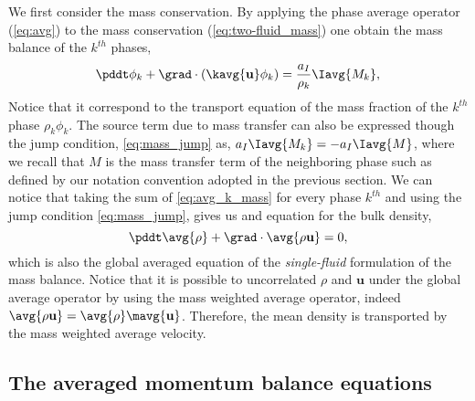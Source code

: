 We first consider the mass conservation. 
By applying the phase average operator (\ref{eq:avg}) to the mass conservation (\ref{eq:two-fluid_mass}) one obtain the mass balance of the $k^{th}$ phases, 
\begin{equation}
    \pddt \phi_k 
    + \grad \cdot \left(
        \kavg{\textbf{u}}\phi_k 
    \right) 
    = \frac{a_I}{\rho_k}\Iavg{M_k},
    \label{eq:avg_k_mass}
\end{equation}
Notice that it correspond to the transport equation of the mass fraction of the 
$k^{th}$ phase $\rho_k \phi_k$. 
The source term due to mass transfer can also be expressed though the jump condition, 
\ref{eq:mass_jump} as, $a_I\Iavg{M_k} = - a_I\Iavg{M}$, where we recall that $M$ is the mass transfer term of the neighboring phase such as defined by our notation convention adopted in the previous section. 
We can notice that taking the sum of \ref{eq:avg_k_mass} for every phase $k^{th}$ and using the jump condition \ref{eq:mass_jump}, gives us and equation for the bulk density,
\begin{equation}
    \pddt \avg{\rho}
    + \grad \cdot 
        \avg{\rho\textbf{u}} 
    = 0,
    \label{eq:avg_mass}
\end{equation}
which is also the global averaged equation of the \textit{single-fluid} formulation of the mass balance. 
Notice that it is possible to uncorrelated $\rho$ and $\textbf{u}$ under the global average operator by using the mass weighted average operator, indeed $\avg{\rho\textbf{u}} = \avg{\rho}\mavg{\textbf{u}}$.
Therefore, the mean density is transported by the mass weighted average velocity. 

\subsection{The averaged momentum balance equations}

